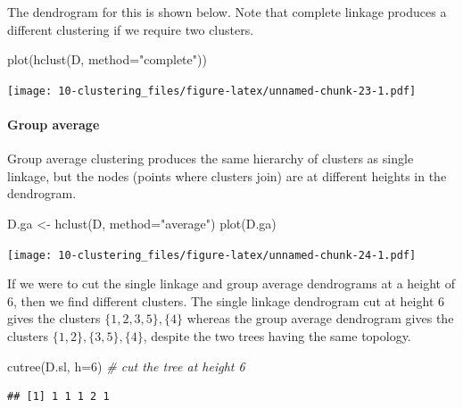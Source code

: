 \documentclass[
]{book}
\newenvironment{Shaded}{\begin{snugshade}}{\end{snugshade}}
\newcommand{\AttributeTok}[1]{\textcolor[rgb]{0.77,0.63,0.00}{#1}}
\newcommand{\CommentTok}[1]{\textcolor[rgb]{0.56,0.35,0.01}{\textit{#1}}}
\newcommand{\DecValTok}[1]{\textcolor[rgb]{0.00,0.00,0.81}{#1}}
\newcommand{\FunctionTok}[1]{\textcolor[rgb]{0.00,0.00,0.00}{#1}}
\newcommand{\NormalTok}[1]{#1}
\newcommand{\OtherTok}[1]{\textcolor[rgb]{0.56,0.35,0.01}{#1}}
\newcommand{\StringTok}[1]{\textcolor[rgb]{0.31,0.60,0.02}{#1}}
\theoremstyle{definition}
\theoremstyle{definition}
\theoremstyle{definition}
\theoremstyle{definition}
\theoremstyle{remark}
\begin{document}
The dendrogram for this is shown below. Note that complete linkage produces a different clustering if we require two clusters.

\begin{Shaded}
\begin{Highlighting}[]
\FunctionTok{plot}\NormalTok{(}\FunctionTok{hclust}\NormalTok{(D, }\AttributeTok{method=}\StringTok{"complete"}\NormalTok{))}
\end{Highlighting}
\end{Shaded}

\texttt{[image: 10-clustering\_files/figure-latex/unnamed-chunk-23-1.pdf]}

\hypertarget{group-average}{%
\paragraph*{Group average}\label{group-average}}

Group average clustering produces the same hierarchy of clusters as single linkage, but the nodes (points where clusters join) are at different heights in the dendrogram.

\begin{Shaded}
\begin{Highlighting}[]
\NormalTok{D.ga }\OtherTok{\textless{}{-}} \FunctionTok{hclust}\NormalTok{(D, }\AttributeTok{method=}\StringTok{"average"}\NormalTok{)}
\FunctionTok{plot}\NormalTok{(D.ga)}
\end{Highlighting}
\end{Shaded}

\texttt{[image: 10-clustering\_files/figure-latex/unnamed-chunk-24-1.pdf]}

If we were to cut the single linkage and group average dendrograms at a height of 6, then we find different clusters. The single linkage dendrogram cut at height 6 gives the clusters \(\{1,2,3,5\}, \{4\}\) whereas the group average dendrogram gives the clusters \(\{1,2\}, \{3,5\}, \{4\}\), despite the two trees having the same topology.

\begin{Shaded}
\begin{Highlighting}[]
\FunctionTok{cutree}\NormalTok{(D.sl, }\AttributeTok{h=}\DecValTok{6}\NormalTok{) }\CommentTok{\# cut the tree at height 6}
\end{Highlighting}
\end{Shaded}

\begin{verbatim}
## [1] 1 1 1 2 1
\end{verbatim}
\end{document}
